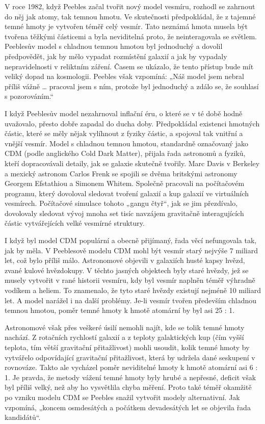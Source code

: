   V roce 1982, když Peebles začal tvořit nový model vesmíru, rozhodl se zahrnout do něj jak atomy,
  tak temnou hmotu. Ve skutečnosti předpokládal, že z tajemné temné hmoty je vytvořen téměř celý
  vesmír. Tato neznámá hmota musela být tvořena těžkými částicemi a byla neviditelná proto, že
  neinteragovala se světlem. Peeblesův model s chladnou temnou hmotou byl jednoduchý a dovolil
  předpovědět, jak by mělo vypadat rozmístění galaxií a jak by vypadaly nepravidelnosti v reliktním
  záření. Časem se ukázalo, že tento přístup bude mít veliký dopad na kosmologii. Peebles však
  vzpomíná: „Náš model jsem nebral příliš vážně … pracoval jsem s ním, protože byl jednoduchý a
  zdálo se, že souhlasí s pozorováním.“
  
  I když Peeblesův model nezahrnoval inflační éru, o které se v té době hodně uvažovalo, přesto
  dobře zapadal do ducha doby. Předpokládal existenci hmotných částic, které se měly nějak vylíhnout
  z fyziky částic, a spojoval tak vnitřní a vnější vesmír. Model s chladnou temnou hmotou,
  standardně označovaný jako CDM (podle anglického Cold Dark Matter), přijala řada astronomů a
  fyziků, kteří dopracovávali detaily, jak se galaxie skutečně tvořily. Marc Davis v Berkeley a
  mexický astronom Carlos Frenk se spojili se dvěma britskými astronomy Georgem Efstathiou a Simonem
  Whitem. Společně pracovali na počítačovém programu, který dovoloval sledovat tvoření galaxií a kup
  galaxií ve virtuálních vesmírech. Počítačové simulace tohoto „gangu čtyř“, jak se jim přezdívalo,
  dovolovaly sledovat vývoj mnoha set tisíc navzájem gravitačně interagujících částic vytvářejících
  velké vesmírné struktury. 
  
  I když byl model CDM populární a obecně přijímaný, řada věcí nefungovala tak, jak by měla. V
  Peeblesově modelu CDM mohl být vesmír starý nejvýše 7 miliard let, což bylo příliš málo.
  Astronomové objevili v galaxiích husté kapsy hvězd, zvané kulové hvězdokupy. V těchto jasných
  objektech byly staré hvězdy, jež se musely vytvořit v rané historii vesmíru, kdy byl vesmír
  naplněn téměř výhradně vodíkem a heliem. To znamenalo, že tyto staré hvězdy existují nejméně 10
  miliard let. A model narážel i na další problémy. Je-li vesmír tvořen především chladnou temnou
  hmotou, poměr temné hmoty k hmotě atomární by byl asi 25 : 1. 
  
  Astronomové však přes veškeré úsilí nemohli najít, kde se tolik temné hmoty nachází. Z rotačních
  rychlostí galaxií a z teploty galaktických kup (čím vyšší teplota, tím větší gravitační
  přitažlivost) mohli usoudit, kolik temné hmoty by vytvářelo odpovídající gravitační přitažlivost,
  která by udržela dané seskupení v rovnováze. Takto ale vycházel poměr neviditelné hmoty k hmotě
  atomární asi 6 : 1. Je pravda, že metody vážení temné hmoty byly hrubé a nepřesné, deficit však
  byl příliš velký, než aby ho vysvětlila chyba měření. Proto také téměř okamžitě po vzniku modelu
  CDM se Peebles snažil vytvořit modely alternativní. Jak vzpomíná, „koncem osmdesátých a počátkem
  devadesátých let se objevila řada kandidátů“. 
  
